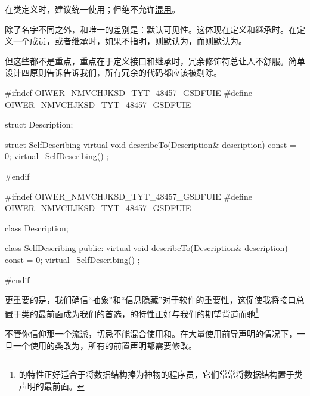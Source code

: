 \begin{content}

\begin{advise}
在类定义时，建议统一使用；但绝不允许\underline{混用}。
\end{advise}

除了名字不同之外，和唯一的差别是：默认可见性。这体现在定义和继承时。在定义一个成员，或者继承时，如果不指明，则默认为，而则默认为。

但这些都不是重点，重点在于定义接口和继承时，冗余修饰符总让人不舒服。简单设计四原则告诉告诉我们，所有冗余的代码都应该被剔除。

\begin{leftbar}
\begin{c++}[caption={\ttfamily{hamcrest/SelfDescribing.h}}]
#ifndef OIWER_NMVCHJKSD_TYT_48457_GSDFUIE
#define OIWER_NMVCHJKSD_TYT_48457_GSDFUIE

struct Description;

struct SelfDescribing
{
    virtual void describeTo(Description& description) const = 0;
    virtual ~SelfDescribing() {}
};

#endif
\end{c++}
\end{leftbar}

\begin{leftbar}
\begin{c++}[caption={\ttfamily{hamcrest/SelfDescribing.h}}]
#ifndef OIWER_NMVCHJKSD_TYT_48457_GSDFUIE
#define OIWER_NMVCHJKSD_TYT_48457_GSDFUIE

class Description;

class SelfDescribing
{
public:
    virtual void describeTo(Description& description) const = 0;
    virtual ~SelfDescribing() {}
};

#endif
\end{c++}
\end{leftbar}

更重要的是，我们确信“抽象”和“信息隐藏”对于软件的重要性，这促使我将接口总置于类的最前面成为我们的首选，的特性正好与我们的期望背道而驰\footnote{的特性正好适合于将数据结构捧为神物的程序员，它们常常将数据结构置于类声明的最前面。}

不管你信仰那一个流派，切忌不能混合使用和。在大量使用前导声明的情况下，一旦一个使用的类改为，所有的前置声明都需要修改。


\end{content}
